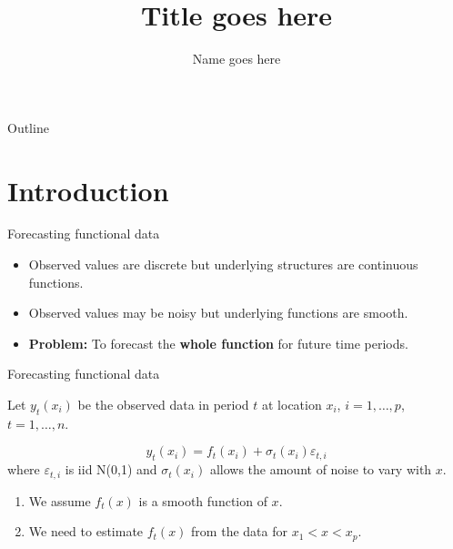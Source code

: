 \documentclass[14pt,xcolor=dvipsnames]{beamer}
\title{Title goes here}
\author{Name goes here}
\begin{document}
\begin{frame}
\titlepage
\end{frame}

\begin{frame}{Outline}
\tableofcontents
\end{frame}

\section{Introduction}

\begin{frame}{Forecasting functional data}
\begin{itemize}[<+-| alert@+>]
\item Observed values are discrete but underlying structures are continuous functions.
\item Observed values may be noisy but underlying functions are smooth.
\item \textbf{Problem:} To forecast the \textbf{whole function} for future time periods.
\end{itemize}
\end{frame}

\begin{frame}{Forecasting functional data}

Let $y_t(x_i)$ be the observed data in period $t$ at location $x_i$, $i=1,\dots,p$, $t=1,\dots,n$.
\pause

\begin{block}{}
$$y_t(x_i) = f_t(x_i) + \sigma_t(x_i)\varepsilon_{t,i}$$
where $\varepsilon_{t,i}$ is iid N(0,1) and $\sigma_t(x_i)$ allows the amount of noise to vary with $x$.
\end{block}
\pause

\begin{enumerate}[<+-| alert@+>]
\item We assume $f_t(x)$ is a smooth function of $x$.
\item We need to estimate $f_t(x)$ from the data for $x_1 < x < x_p$.
\end{enumerate}
\end{frame}
\end{document}

